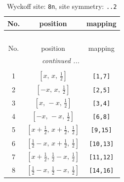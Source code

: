 \documentclass[fleqn,8pt]{jsarticle}
\begin{document}
\begin{longtable}{ccc}
\caption{Wyckoff site: {\tt 8n}, site symmetry: {\tt ..2}}
 \\
 \hline \hline
No. & position & mapping \\ \hline \endfirsthead

\multicolumn{2}{l}{\tablename\ \thetable{}} \\
 \hline \hline
No. & position & mapping \\ \hline \endhead

 \hline \hline
\multicolumn{2}{r}{\footnotesize\it continued ...} \\ \endfoot

 \hline \hline
\multicolumn{2}{r}{} \\ \endlastfoot

1 & $\left[ x,\, x,\, \frac{1}{2} \right]$ & {\tt [1,7]} \\ \hline
2 & $\left[ - x,\, x,\, \frac{1}{2} \right]$ & {\tt [2,5]} \\ \hline
3 & $\left[ x,\, - x,\, \frac{1}{2} \right]$ & {\tt [3,4]} \\ \hline
4 & $\left[ - x,\, - x,\, \frac{1}{2} \right]$ & {\tt [6,8]} \\ \hline
5 & $\left[ x + \frac{1}{2},\, x + \frac{1}{2},\, \frac{1}{2} \right]$ & {\tt [9,15]} \\ \hline
6 & $\left[ \frac{1}{2} - x,\, x + \frac{1}{2},\, \frac{1}{2} \right]$ & {\tt [10,13]} \\ \hline
7 & $\left[ x + \frac{1}{2},\, \frac{1}{2} - x,\, \frac{1}{2} \right]$ & {\tt [11,12]} \\ \hline
8 & $\left[ \frac{1}{2} - x,\, \frac{1}{2} - x,\, \frac{1}{2} \right]$ & {\tt [14,16]} \\
\end{longtable}
\renewcommand{\arraystretch}{1.2}
\end{document}
